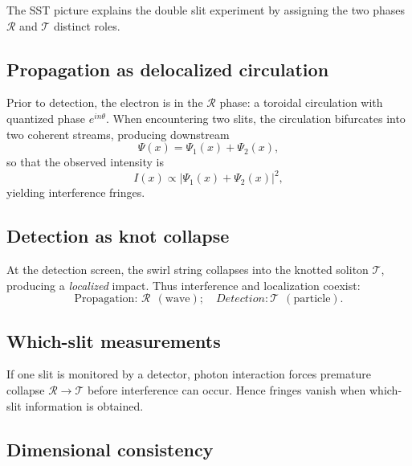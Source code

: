 \documentclass[11pt,a4paper]{article}
\begin{document}
    The SST picture explains the double slit experiment by assigning the
    two phases $\mathcal R$ and $\mathcal T$ distinct roles.

    \subsection{Propagation as delocalized circulation}

        Prior to detection, the electron is in the $\mathcal R$ phase:
        a toroidal circulation with quantized phase $e^{i n\theta}$.
        When encountering two slits, the circulation bifurcates into two
        coherent streams, producing downstream
        \begin{equation}
        \Psi(x) = \Psi_1(x) + \Psi_2(x),
        \end{equation}
        so that the observed intensity is
        \begin{equation}
        I(x) \propto |\Psi_1(x)+\Psi_2(x)|^2,
        \end{equation}
        yielding interference fringes.

    \subsection{Detection as knot collapse}

        At the detection screen, the swirl string collapses into the knotted soliton $\mathcal T$,
        producing a \emph{localized} impact.
        Thus interference and localization coexist:
        \begin{equation}
        \boxed{\ \text{Propagation: }\mathcal R\ \ (\text{wave}); \quad
        Detection: \mathcal T\ \ (\text{particle}).\ }
        \end{equation}

    \subsection{Which-slit measurements}

        If one slit is monitored by a detector, photon interaction forces premature collapse
        $\mathcal R \to \mathcal T$ before interference can occur.
        Hence fringes vanish when which-slit information is obtained.

    \subsection{Dimensional consistency}
\end{document}
